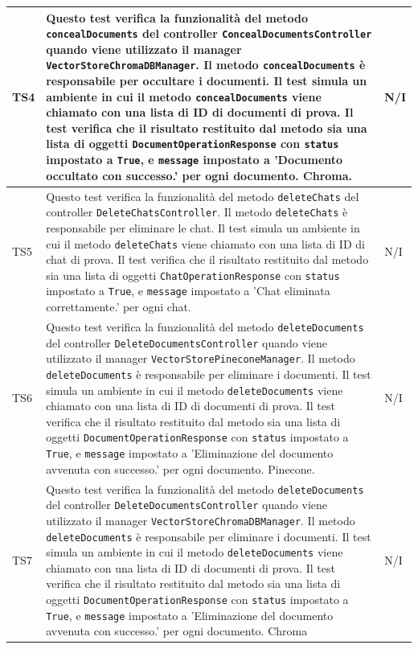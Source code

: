 \documentclass[10pt, a4paper]{article}
\begin{document}
\begin{xltabular}{\textwidth}{p{0.12\textwidth}|X|p{0.12\textwidth}}
    \hline
    TS4 & Questo test verifica la funzionalità del metodo \texttt{concealDocuments} del controller \texttt{ConcealDocumentsController} quando viene utilizzato il manager \texttt{VectorStoreChromaDBManager}. Il metodo \texttt{concealDocuments} è responsabile per occultare i documenti. Il test simula un ambiente in cui il metodo \texttt{concealDocuments} viene chiamato con una lista di ID di documenti di prova. Il test verifica che il risultato restituito dal metodo sia una lista di oggetti \texttt{DocumentOperationResponse} con \texttt{status} impostato a \texttt{True}, e \texttt{message} impostato a 'Documento occultato con successo.' per ogni documento. Chroma. & N/I \\
    \hline
    TS5 & Questo test verifica la funzionalità del metodo \texttt{deleteChats} del controller \texttt{DeleteChatsController}. Il metodo \texttt{deleteChats} è responsabile per eliminare le chat. Il test simula un ambiente in cui il metodo \texttt{deleteChats} viene chiamato con una lista di ID di chat di prova. Il test verifica che il risultato restituito dal metodo sia una lista di oggetti \texttt{ChatOperationResponse} con \texttt{status} impostato a \texttt{True}, e \texttt{message} impostato a 'Chat eliminata correttamente.' per ogni chat. & N/I \\
    \hline
    TS6 & Questo test verifica la funzionalità del metodo \texttt{deleteDocuments} del controller \texttt{DeleteDocumentsController} quando viene utilizzato il manager \texttt{VectorStorePineconeManager}. Il metodo \texttt{deleteDocuments} è responsabile per eliminare i documenti. Il test simula un ambiente in cui il metodo \texttt{deleteDocuments} viene chiamato con una lista di ID di documenti di prova. Il test verifica che il risultato restituito dal metodo sia una lista di oggetti \texttt{DocumentOperationResponse} con \texttt{status} impostato a \texttt{True}, e \texttt{message} impostato a 'Eliminazione del documento avvenuta con successo.' per ogni documento. Pinecone. & N/I \\
    \hline
    TS7 & Questo test verifica la funzionalità del metodo \texttt{deleteDocuments} del controller \texttt{DeleteDocumentsController} quando viene utilizzato il manager \texttt{VectorStoreChromaDBManager}. Il metodo \texttt{deleteDocuments} è responsabile per eliminare i documenti. Il test simula un ambiente in cui il metodo \texttt{deleteDocuments} viene chiamato con una lista di ID di documenti di prova. Il test verifica che il risultato restituito dal metodo sia una lista di oggetti \texttt{DocumentOperationResponse} con \texttt{status} impostato a \texttt{True}, e \texttt{message} impostato a 'Eliminazione del documento avvenuta con successo.' per ogni documento. Chroma & N/I \\

\end{xltabular}
\end{document}
